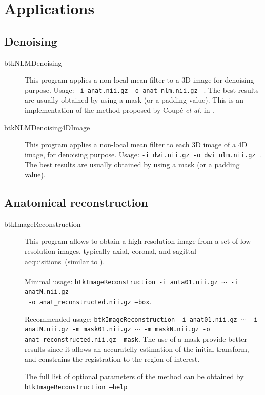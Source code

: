 \section{Applications}

\subsection{Denoising \cite{coupe_2008}}

\begin{description}
 \item[btkNLMDenoising] This program applies a non-local mean filter to a 3D
image  for denoising purpose. Usage: \texttt{-i anat.nii.gz -o anat\_nlm.nii.gz }
. The best results are usually obtained by using a mask
(or a padding value). This is an implementation of the method proposed by Coup\'e \textit{et al.} in \cite{coupe_2008}.
\end{description}

\begin{description}
 \item[btkNLMDenoising4DImage] This program applies a non-local mean filter to 
 each 3D image of a 4D image, for denoising purpose. Usage: \texttt{-i dwi.nii.gz -o dwi\_nlm.nii.gz }. The best results are usually
obtained by using a mask (or a padding value).
\end{description}


\subsection{Anatomical reconstruction}
\label{subsec:ana_rec}

\begin{description}
 \item[btkImageReconstruction] This program allows to obtain a
high-resolution image from a set of low-resolution images, typically
axial, coronal, and sagittal acquisitions~(similar to \cite{rousseau_registration_2006}). \\\\
Minimal usage: \texttt{btkImageReconstruction -i anta01.nii.gz $\cdots$ -i anatN.nii.gz \\\ -o
anat\_reconstructed.nii.gz --box}. 

Recommended usage: \texttt{btkImageReconstruction -i anat01.nii.gz $\cdots$ -i anatN.nii.gz
-m mask01.nii.gz $\cdots$ -m maskN.nii.gz -o anat\_reconstructed.nii.gz --mask}. The use of a mask provide
better results since it allows an accuratelly estimation of the initial
transform, and constrains the registration to the region of interest.

The full list of optional parameters of the method can be obtained by
\texttt{btkImageReconstruction --help}

\end{description}

